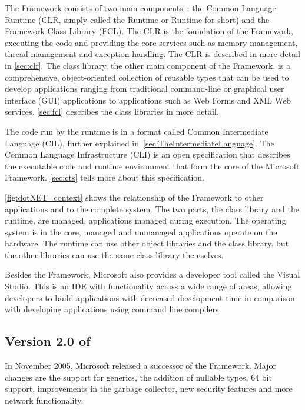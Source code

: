 %
%
%
%
%
The \dotNET Framework consists of two main components~\cite{Microsoft03-1}: the Common Language Runtime (CLR, simply called the \dotNET Runtime or Runtime for short) and the \dotNET Framework Class Library (FCL). 
The CLR is the foundation of the \dotNET Framework, executing the code and providing the core services such as memory management, thread management and exception handling. The CLR is described in more detail in \autoref{sec:clr}.
The class library, the other main component of the \dotNET Framework, is a comprehensive, object-oriented collection of reusable types that can be used to develop applications ranging from traditional command-line or graphical user interface (GUI) applications to applications such as Web Forms and XML Web services. \autoref{sec:fcl} describes the class libraries in more detail.

The code run by the runtime is in a format called Common Intermediate Language (CIL), further explained in~\autoref{sec:TheIntermediateLanguage}. The Common Language Infrastructure (CLI) is an open specification that describes the executable code and runtime environment that form the core of the Microsoft \dotNET Framework. \autoref{sec:cts} tells more about this specification.

\autoref{fig:dotNET_context} shows the relationship of the \dotNET Framework to other applications and to the complete system. The two parts, the class library and the runtime, are managed, \ie applications managed during execution. The operating system is in the core, managed and unmanaged applications operate on the hardware. The runtime can use other object libraries and the class library, but the other libraries can use the same class library themselves.

Besides the Framework, Microsoft also provides a developer tool called the Visual Studio. This is an IDE with functionality across a wide range of areas, allowing developers to build applications with decreased development time in comparison with developing applications using command line compilers.

\subsection{Version 2.0 of \dotNET}
\label{sec:Version2}
In November 2005, Microsoft released a successor of the \dotNET Framework. 
Major changes are the support for generics, the addition of nullable types, 64 bit support, improvements in the garbage collector, new security features and more network functionality.

